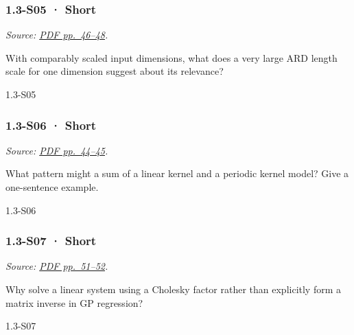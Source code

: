 \noindent\begin{minipage}{\linewidth}

\subsubsection{1.3-S05 · Short}\label{s05-short-2}

\emph{Source:
\href{../Lecture\%20Slides/1.3.\%20Bayesian\%20Learning.pdf\#page=46}{PDF
pp.~46--48}.}

With comparably scaled input dimensions, what does a very large ARD
length scale for one dimension suggest about its relevance?

\begin{solution}[20mm]{1.3-S05}

\end{solution}
\end{minipage}\par\medskip

\noindent\begin{minipage}{\linewidth}

\subsubsection{1.3-S06 · Short}\label{s06-short-2}

\emph{Source:
\href{../Lecture\%20Slides/1.3.\%20Bayesian\%20Learning.pdf\#page=44}{PDF
pp.~44--45}.}

What pattern might a sum of a linear kernel and a periodic kernel model?
Give a one-sentence example.

\begin{solution}[20mm]{1.3-S06}

\end{solution}
\end{minipage}\par\medskip

\noindent\begin{minipage}{\linewidth}

\subsubsection{1.3-S07 · Short}\label{s07-short-2}

\emph{Source:
\href{../Lecture\%20Slides/1.3.\%20Bayesian\%20Learning.pdf\#page=51}{PDF
pp.~51--52}.}

Why solve a linear system using a Cholesky factor rather than explicitly
form a matrix inverse in GP regression?

\begin{solution}[20mm]{1.3-S07}

\end{solution}
\end{minipage}\par\medskip

